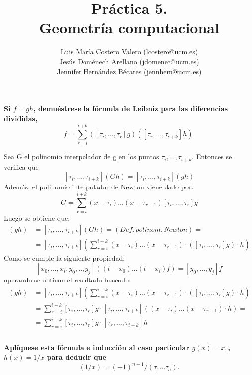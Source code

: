 \documentclass[12pt,a4paper]{article}
\title{Práctica 5. \\ Geometría computacional}
\author{Luis María Costero Valero (lcostero@ucm.es)\\ Jesús Doménech
  Arellano (jdomenec@ucm.es) \\ Jennifer Hernández Bécares (jennhern@ucm.es)}
\date{}
\begin{document}
\maketitle
\onehalfspace


\textbf{Si $f=gh$, demuéstrese la fórmula de Leibniz para las diferencias divididas,}
\begin{equation*}
  [\tau_i,\dots,\tau_{i+k}]f=\sum\limits_{r=i}^{i+k}([\tau_i,\dots,\tau_r]g)([\tau_r,\dots,\tau_{i+k}]h).
\end{equation*}

Sea G el polinomio interpolador de g en los puntos $\tau_i, ... ,
\tau_{i+k}$. Entonces se verifica que $$[\tau_{i}, ..., \tau_{i+k}](Gh) =
[\tau_i, ..., \tau_{i+k}](gh)$$
Además, el polinomio interpolador de Newton viene dado por:
$$ G = \sum\limits^{i+k}_{r=i}(x-\tau_i)\dots(x-\tau_{r-1})[\tau_i,\dots,\tau_{r}]g$$
Luego se obtiene que:
\begin{align*}
  [\tau_i,\dots,\tau_{i+k}](gh) &= [\tau_i,\dots,\tau_{i+k}](Gh) = (Def.\,polinom.\,Newton)=\\
                      &= [\tau_i,\dots,\tau_{i+k}]\left(\sum\limits_{r=i}^{i+k}(x-\tau_i)...(x-\tau_{r-1})\cdot([\tau_i,...,\tau_r]g)
                        \cdot h\right)
\end{align*}
Como se cumple la siguiente propiedad:
$$[x_0, ..., x_i, y_0, .., y_j]((t-x_0)...(t-x_i)f) = [y_0,...,y_j]f$$
operando se obtiene el resultado buscado:
\begin{align*}
  [\tau_i,\dots,\tau_{i+k}](gh) &=
                                  [\tau_i,\dots,\tau_{i+k}]\left(\sum\limits_{r=i}^{i+k}(x-\tau_i)...(x-\tau_{r-1})\cdot([\tau_i,...,\tau_r]g)
                                  \cdot h\right)\\
                      &=\sum\limits^{i+k}_{r=i}[\tau_i,\dots,\tau_{r}]g \cdot
                        [\tau_i,\dots,\tau_{i+k}]\left((x-\tau_i)\dots(x-\tau_{r-1})\cdot
                        h\right)=\\
                      &=\sum\limits^{i+k}_{r=i}[\tau_i,\dots,\tau_r]g \cdot [\tau_r,
                        \dots, \tau_{i+k}]h\\
\end{align*}\\

\textbf{Aplíquese esta fórmula e inducción al caso particular $g(x)=x,$, $h(x)=1/x$ para deducir que}
\begin{equation*}
  [\tau_1,...,\tau_n](1/x)=(-1)^{n-1}/(\tau_1...\tau_n).
\end{equation*}
\end{document}
